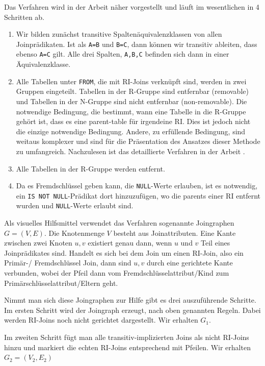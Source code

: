 Das Verfahren wird in der Arbeit \cite{joinelem2} näher vorgestellt und läuft im wesentlichen in 4 Schritten ab.

\begin{enumerate}
\item Wir bilden zunächst transitive Spaltenäquivalenzklassen von allen Joinprädikaten. Ist als \verb|A=B| und \verb|B=C|, dann können wir transitiv ableiten, dass ebenso \verb|A=C| gilt. Alle drei Spalten, \verb|A,B,C| befinden sich dann in einer Äquivalenzklasse.

\item Alle Tabellen unter \verb|FROM|, die mit RI-Joins verknüpft sind, werden in zwei Gruppen eingeteilt. Tabellen in der R-Gruppe sind entfernbar (removable) und Tabellen in der N-Gruppe sind nicht entfernbar (non-removable). Die notwendige Bedingung, die bestimmt, wann eine Tabelle in die R-Gruppe gehört ist, dass es eine parent-table für irgendeine RI. Dies ist jedoch nicht die einzige notwendige Bedingung. Andere, zu erfüllende Bedingung, sind weitaus komplexer und sind für die Präsentation des Ansatzes dieser Methode zu umfangreich. Nachzulesen ist das detaillierte Verfahren in der Arbeit \cite{joinelem2}.

\item Alle Tabellen in der R-Gruppe werden entfernt.

\item Da es Fremdschlüssel geben kann, die \verb|NULL|-Werte erlauben, ist es notwendig, ein \verb|IS NOT NULL|-Prädikat dort hinzuzufügen, wo die parents einer RI entfernt wurden und \verb|NULL|-Werte erlaubt sind.
\end{enumerate}

Als visuelles Hilfsmittel verwendet das Verfahren sogenannte Joingraphen $G=(V,E)$. Die Knotenmenge $V$ besteht aus Joinattributen. Eine Kante zwischen zwei Knoten $u,v$ existiert genau dann, wenn $u$ und $v$ Teil eines Joinprädikates sind. Handelt es sich bei dem Join um einen RI-Join, also ein Primär-/ Fremdschlüssel Join, dann sind $u,v$ durch eine gerichtete Kante verbunden, wobei der Pfeil dann vom Fremdschlüsselattribut/Kind zum Primärschlüsselattribut/Eltern geht.

Nimmt man sich diese Joingraphen zur Hilfe gibt es drei auszuführende Schritte. Im ersten Schritt wird der Joingraph erzeugt, nach oben genannten Regeln. Dabei werden RI-Joins noch nicht gerichtet dargestellt. Wir erhalten $G_1$.

Im zweiten Schritt fügt man alle transitiv-implizierten Joins als nicht RI-Joins hinzu und markiert die echten RI-Joins entsprechend mit Pfeilen. Wir erhalten $G_2=(V_2,E_2)$

